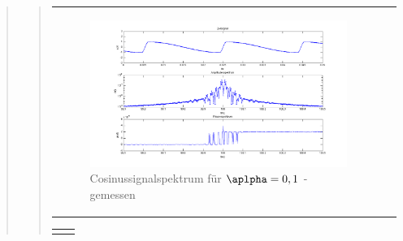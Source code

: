 \begin{quote}
\begin{quote}
\begin{center}
\begin{tabular}{ll}
\begin{minipage}{0.6\textwidth}
                \end{minipage}
                \begin{minipage}{0.6\textwidth}

                    \begin{figure}[H]
                        \label{fig:}            
                        \includegraphics[scale=0.3]{./Bilder/cos_alpha1_-_gemessen.png} %
                        \caption{Cosinussignalspektrum für $\aplpha = 0,1$ - gemessen}
                    \end{figure}                
                \vspace{-1.5em}

                \end{minipage}

            \end{tabular}
            \end{center}

            \begin{center}
            \begin{tabular}{ll}

            \hspace{-12em}
                \begin{minipage}{0.6\textwidth}


\end{minipage}
\end{tabular}
\end{center}
\end{quote}
\end{quote}
